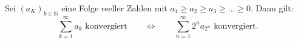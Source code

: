 Sei $(a_K)_{k \in \mathbb{N}}$ eine Folge reeller Zahlen mit $a_1 \geq a_2 \geq a_3 \geq \dots \geq 0$. Dann gilt:
$$\sum_{k=1}^\infty a_k \text{ konvergiert} \qquad \Longleftrightarrow \qquad \sum_{n=1}^\infty 2^n a_{2^n} \text{ konvergiert.}$$